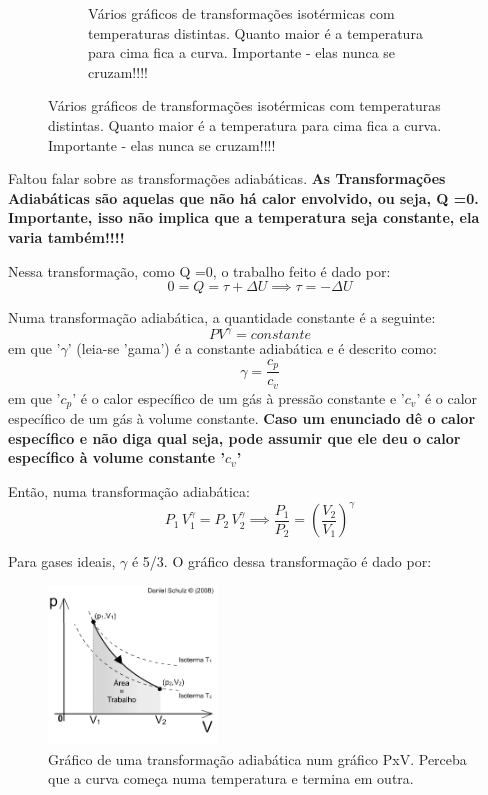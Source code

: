 \documentclass[12pt]{extarticle}
\newcommand{\<}{\langle}
\renewcommand{\>}{\rangle}
\theoremstyle{definition}
\begin{document}
\begin{figure}[H]
\begin{subfigure}[b]{0.45\textwidth}
         \caption{Vários gráficos de transformações isotérmicas com temperaturas distintas. Quanto maior é a temperatura para cima fica a curva. Importante - elas nunca se cruzam!!!!}
         \label{fig:isotermas_2}
     \end{subfigure}
\end{figure}

Faltou falar sobre as transformações adiabáticas. \textbf{As Transformações Adiabáticas são aquelas que não há calor envolvido, ou seja, Q =0. Importante, isso não implica que a temperatura seja constante, ela varia também!!!!}

Nessa transformação, como Q =0, o trabalho feito é dado por:
\begin{equation}
   0= Q = \tau + \Delta U \implies \tau = -\Delta U
\end{equation}

Numa transformação adiabática, a quantidade constante é a seguinte:
\begin{equation}
    PV^\gamma = constante
\end{equation}
\noindent em que '$\gamma$' (leia-se 'gama') é a constante adiabática e é descrito como:
\begin{equation}
    \gamma = \frac{c_p}{c_v}
\end{equation}
\noindent em que '$c_p$' é o calor específico de um gás à pressão constante e '$c_v$' é o calor específico de um gás à volume constante. \textbf{Caso um enunciado dê o calor específico e não diga qual seja, pode assumir que ele deu o calor específico à volume constante '$c_v$'}

Então, numa transformação adiabática:
\begin{equation}
    P_1\,V_1^\gamma = P_2\,V_2^\gamma \implies \frac{P_1}{P_2} = \left(\frac{V_2}{V_1} \right)^\gamma
\end{equation}

Para gases ideais, $\gamma$ é 5/3. O gráfico dessa transformação é dado por:
\begin{figure}[H]
    \centering
    \includegraphics[width=0.4\textwidth]{adiabatica.jpg}
    \caption{Gráfico de uma transformação adiabática num gráfico PxV. Perceba que a curva começa numa temperatura e termina em outra.}
    \label{fig:adiabatica}
\end{figure}
\end{document}
